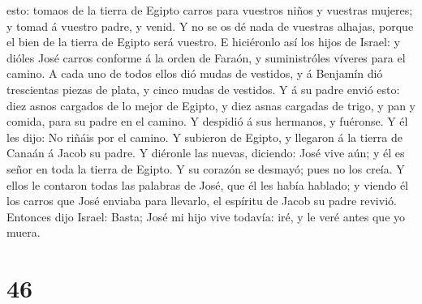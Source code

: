 esto: tomaos de la tierra de Egipto carros para vuestros niños y
vuestras mujeres; y tomad á vuestro padre, y venid.  Y no
se os dé nada de vuestras alhajas, porque el bien de la tierra de Egipto
será vuestro.  E hiciéronlo así los hijos de Israel: y
dióles José carros conforme á la orden de Faraón, y suministróles
víveres para el camino.  A cada uno de todos ellos dió
mudas de vestidos, y á Benjamín dió trescientas piezas de plata, y cinco
mudas de vestidos.  Y á su padre envió esto: diez asnos
cargados de lo mejor de Egipto, y diez asnas cargadas de trigo, y pan y
comida, para su padre en el camino.  Y despidió á sus
hermanos, y fuéronse. Y él les dijo: No riñáis por el camino.
 Y subieron de Egipto, y llegaron á la tierra de Canaán á
Jacob su padre.  Y diéronle las nuevas, diciendo: José
vive aún; y él es señor en toda la tierra de Egipto. Y su corazón se
desmayó; pues no los creía.  Y ellos le contaron todas
las palabras de José, que él les había hablado; y viendo él los carros
que José enviaba para llevarlo, el espíritu de Jacob su padre revivió.
 Entonces dijo Israel: Basta; José mi hijo vive todavía:
iré, y le veré antes que yo muera.

\hypertarget{section-45}{%
\section{46}\label{section-45}}

